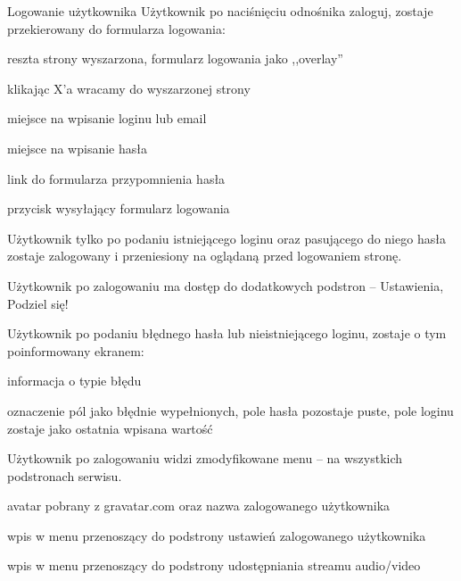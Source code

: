\begin{userstory}{Logowanie użytkownika}
    Użytkownik po naciśnięciu odnośnika zaloguj,
    zostaje przekierowany do formularza logowania:
    \begin{packed_enum}
        \item reszta strony wyszarzona, formularz logowania jako ,,overlay''
        \item klikając X'a wracamy do wyszarzonej strony
        \item miejsce na wpisanie loginu lub email
        \item miejsce na wpisanie hasła
        \item link do formularza przypomnienia hasła
        \item przycisk wysyłający formularz logowania
    \end{packed_enum}
    
    \begin{tests}
        \item{
            Użytkownik tylko po podaniu istniejącego loginu oraz pasującego do niego hasła
            zostaje zalogowany i przeniesiony na oglądaną przed logowaniem stronę.
        }
        \item{
            Użytkownik po zalogowaniu ma dostęp do dodatkowych podstron -- Ustawienia, Podziel się!
        }
        \item{
            Użytkownik po podaniu błędnego hasła lub nieistniejącego loginu, zostaje o tym poinformowany ekranem:
            \begin{packed_enum}
                \item informacja o typie błędu
                \item oznaczenie pól jako błędnie wypełnionych, pole hasła pozostaje puste, pole loginu zostaje jako ostatnia wpisana wartość
            \end{packed_enum}
        }
        \item{
            Użytkownik po zalogowaniu widzi zmodyfikowane menu -- na wszystkich podstronach serwisu.
            \begin{packed_enum}
                \item avatar pobrany z gravatar.com oraz nazwa zalogowanego użytkownika
                \item wpis w menu przenoszący do podstrony ustawień zalogowanego użytkownika
                \item wpis w menu przenoszący do podstrony udostępniania streamu audio/video
            \end{packed_enum}
        }
    \end{tests}
\end{userstory}

